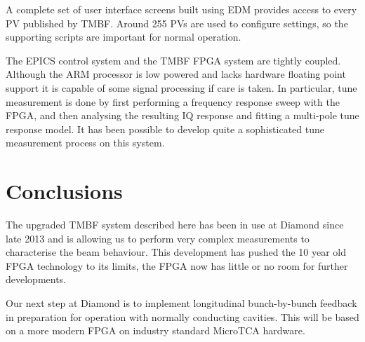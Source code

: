 \documentclass{jacow}
\begin{document}
A complete set of user interface screens built using EDM provides access to
every PV published by TMBF.  Around 255 PVs are used to configure settings, so
the supporting scripts are important for normal operation.

The EPICS control system and the TMBF FPGA system are tightly coupled.  Although
the ARM processor is low powered and lacks hardware floating point support it is
capable of some signal processing if care is taken.  In particular, tune
measurement is done by first performing a frequency response sweep with the
FPGA, and then analysing the resulting IQ response and fitting a multi-pole tune
response model.  It has been possible to develop quite a sophisticated tune
measurement process on this system.


\section{Conclusions}

The upgraded TMBF system described here has been in use at Diamond since late
2013 and is allowing us to perform very complex measurements to characterise the
beam behaviour.  This development has pushed the 10 year old FPGA technology to
its limits, the FPGA now has little or no room for further developments.

Our next step at Diamond is to implement longitudinal bunch-by-bunch feedback in
preparation for operation with normally conducting cavities.  This will be based
on a more modern FPGA on industry standard MicroTCA hardware.
\end{document}
